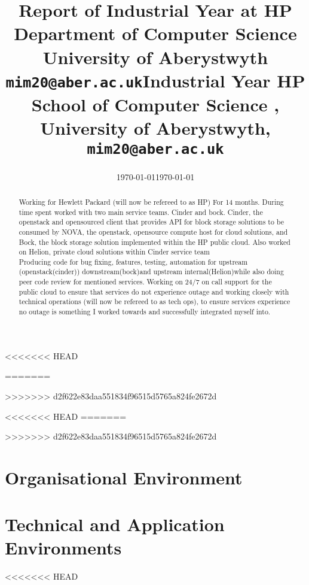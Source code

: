 \documentclass[11pt,a4paper]{report}
\begin{document}
<<<<<<< HEAD
\title{Report of Industrial Year at HP\\Department of Computer Science\\ University of Aberystwyth\\ \texttt{mim20@aber.ac.uk}} \date{\today}
=======
\title{Industrial Year HP School of Computer Science ,\\ University of Aberystwyth,\\ \texttt{mim20@aber.ac.uk}} \date{\today}
>>>>>>> d2f622e83daa551834f96515d5765a824fe2672d
\maketitle

\begin{abstract} 

Working for Hewlett Packard (will now be refereed to as HP) For 14 months. During time spent worked with two main service teams. Cinder and bock. Cinder, the openstack and opensourced client that provides API for block storage solutions to be consumed by NOVA, the openstack, opensource compute host for cloud solutions, and Bock, the block storage solution implemented within the HP public cloud. Also worked on Helion, private cloud solutions within Cinder service team\\ 
Producing code for bug fixing, features, testing, automation for upstream (openstack(cinder)) downstream(bock)and upstream internal(Helion)while also doing peer code review for mentioned services. 
Working on 24/7 on call support for the public cloud to ensure that services do not experience outage and working closely with technical operations (will now be refereed to as tech ops), to ensure services experience no outage is something I worked towards and successfully integrated myself into.

\end{abstract}

<<<<<<< HEAD
\tableofcontents
\newpage
=======

>>>>>>> d2f622e83daa551834f96515d5765a824fe2672d
\section{Organisational Environment}
 


\section{Technical and Application Environments}
<<<<<<< HEAD
\end{document}
